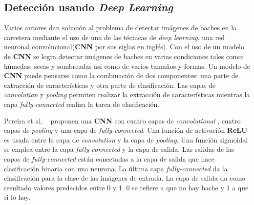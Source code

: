 	\subsection{Detección usando \emph{Deep Learning}}
	Varios autores dan solución al problema de detectar imágenes de baches en la carretera mediante el uso de una de las técnicas  
	de \emph{deep learning}, una red neuronal convolucional(\textbf{CNN} por sus siglas en inglés). Con el uso de un modelo de \textbf{CNN} se logra  
	detectar imágenes de baches en varias condiciones tales como: húmedas, secas y sombreadas asi como de varios tamaños y formas.
	Un modelo de \textbf{CNN} puede pensarse como la combinación de dos componentes: una parte de extracción de características
	y otra parte de clasificación. Las capas de \emph{convolution} y \emph{pooling}  permiten realizar la extracción de características
	mientras la capa \emph{fully-connected} realiza la tarea de clasificación. 

	Pereira et al. ~ proponen una \textbf{CNN} con cuatro capas de \emph{convolutional} , cuatro
	capas de \emph{pooling} y una capa de \emph{fully-connected}. Una función de activación \textbf{ReLU} es usada entre 
	la capa de \emph{convolution} y la capa de \emph{pooling}. Una función sigmoidal se emplea entre la capa \emph{fully-connected}
	y la capa de salida. Las salidas de las capas de \emph{fully-connected} están conectadas a la capa de salida que hace 
	clasificación binaria con una neurona. La última capa \emph{fully-connected} da la clasificación para la clase de las imágenes de entrada.
	La capa de salida da como resultado  valores predecidos entre 0 y 1. 0 se refiere a que no hay bache y 1 a que si lo hay.
	

	

